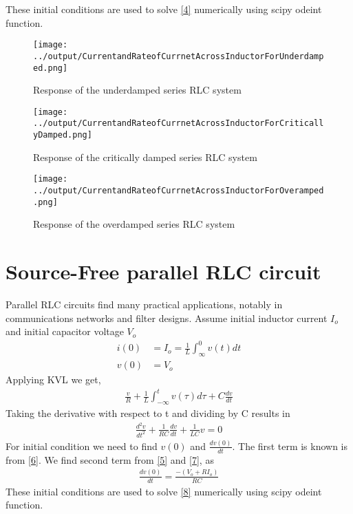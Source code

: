 \documentclass[11pt,a4paper]{article}
\begin{document}
These initial conditions are used to solve \ref{4} numerically using scipy odeint function.

\begin{figure}[H]
\texttt{[image: ../output/CurrentandRateofCurrnetAcrossInductorForUnderdamped.png]}
\caption{Response of the underdamped series RLC system }
\centering
\end{figure}

\begin{figure}[H]
\texttt{[image: ../output/CurrentandRateofCurrnetAcrossInductorForCriticallyDamped.png]}
\caption{Response of the critically damped series RLC system }
\centering
\end{figure}

\begin{figure}[H]
\texttt{[image: ../output/CurrentandRateofCurrnetAcrossInductorForOveramped.png]}
\caption{Response of the overdamped series RLC system }
\centering
\end{figure}

\section{Source-Free parallel RLC circuit \cite{Alexander}}
Parallel RLC circuits find many practical applications, notably in communications networks and filter designs.
Assume initial inductor current $I_o$ and initial capacitor voltage $V_o$ 
\begin{align}
i(0) &= I_o = \frac{1}{L}\int_{\infty}^{0}v(t)dt \label{5}\\
v(0) &= V_o \label{6}
\end{align}
Applying KVL we get,
 \begin{align}
 \frac{v}{R} + \frac{1}{L}\int_{-\infty}^tv(\tau)d\tau + C\frac{dv}{dt} \label{7}
 \end{align}
 Taking the derivative with respect to t and dividing by C results in
 \begin{align}
 \frac{d^2v}{dt^2} + \frac{1}{RC}\frac{dv}{dt} + \frac{1}{LC}v =0 \label{8}
 \end{align}
 For initial condition we need to find $v(0)$ and $\frac{dv(0)}{dt}$. The first term is known is from \ref{6}.
 We find second term from \ref{5} and \ref{7}, as
 \begin{align}
 \frac{dv(0)}{dt} = \frac{-(V_o+RI_o)}{RC}
 \end{align}
 These initial conditions are used to solve \ref{8} numerically using scipy odeint function.
 
\end{document}
